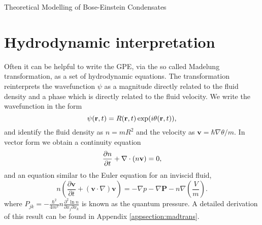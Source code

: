 \begin{chapter}{\label{cha:theoretical_model}Theoretical Modelling of Bose-Einstein Condensates}
\section{\label{section:hydrodynamic} Hydrodynamic interpretation}
	Often it can be helpful to write the GPE, via the so called Madelung transformation, as a set of hydrodynamic equations. The transformation reinterprets the wavefunction $\psi$ as a magnitude directly related to the fluid density and a phase which is directly related to the fluid velocity. We write the wavefunction in the form
	\begin{equation}
		\psi({\bf r},t) = R({\bf r},t)\exp (i\theta({\bf r},t)),
	\end{equation}
	 and identify the fluid density as $n=mR^2$ and the velocity as $\mathbf{v} = \hbar\nabla\theta/m $.
	In vector form we obtain a continuity equation
	\begin{equation}
	  \frac{\partial n}{\partial t} + \nabla\cdot(n{\bf v}) = 0,
	  \label{eq:MTcont}
	\end{equation}
	and an equation similar to the Euler equation for an inviscid fluid,
	\begin{equation}
	n\left( \frac{\partial \mathbf{v}}{\partial t} + \left( \mathbf{v} \cdot \nabla \right)\mathbf{v} \right) = -\nabla p - \nabla \mathbf{P} - n \nabla \left(\frac{V}{m}\right).
	\end{equation}
	where $P_{jk} = -\frac{\hbar^2}{4m^2}n\frac{\partial^2\ln{n}}{\partial x_j \partial x_k}$ is known as the quantum pressure.
	A detailed derivation of this result can be found in Appendix \ref{appsection:madtrans}.


\end{chapter}
